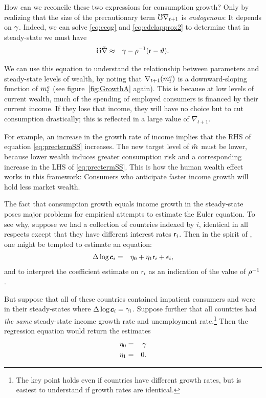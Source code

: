 \documentclass{handout}
\begin{document}
How can we reconcile these two expressions for consumption growth?
Only by realizing that the size of the precautionary term $\mho
\nabla_{t+1}$ is {\it endogenous}: It depends on $\gamma$.  Indeed, we
can solve \eqref{eq:ceqg} and \eqref{eq:cdelapprox2} to determine that
in steady-state we must have 
\begin{eqnarray}
        \mho \check{\nabla} & \approx & \gamma - \rho^{-1}(\mathsf{r}-\vartheta). \label{eq:prectermSS}
\end{eqnarray}

We can use this equation to understand the relationship between
parameters and steady-state levels of wealth, by noting that
$\nabla_{t+1}(m^{e}_{t})$ is a downward-sloping function of
$m^{e}_{t}$ (see figure~\ref{fig:GrowthA} again).  This is because at
low levels of current wealth, much of the spending of employed
consumers is financed by their current income.  If they lose that
income, they will have no choice but to cut consumption drastically; this is
reflected in a large value of $\nabla_{t+1}$.

For example, an increase in the growth rate of income implies that the
RHS of equation \eqref{eq:prectermSS} increases.  The new target level of
$\mTarg^{\null}$ must be lower, because lower wealth induces greater consumption risk and a corresponding increase in the LHS of \eqref{eq:prectermSS}.  This is how the human wealth effect works in this framework:
Consumers who anticipate faster income growth will hold less market wealth.

The fact that consumption growth equals income growth in the
steady-state poses major problems for empirical attempts to estimate
the Euler equation.  To see why, suppose we had a collection of
countries indexed by $i$, identical in all respects except that
they have different interest rates $\mathsf{r}_{i}$.
Then in the spirit of \cite{hallSubstitution}, one might be
tempted to estimate an equation:
\begin{eqnarray}
        \Delta \log \pmb{c}_{i} & = & \eta_{0} + \eta_{1} \mathsf{r}_{i}+\epsilon_{i},
\end{eqnarray}
and to interpret the coefficient estimate on $\mathsf{r}_{i}$ as an indication
of the value of $\rho^{-1}$.

But suppose that all of these countries contained impatient consumers
and were in their steady-states where $\Delta \log \pmb{c}_{i} = \gamma_{i}$.
Suppose further
that all countries had {\it the same} steady-state income growth rate and
unemployment rate.\footnote{The key point holds even if countries have different
growth rates, but is easiest to understand if growth rates are identical.}
Then the regression equation would return the estimates
\begin{eqnarray}
        \eta_{0} & = & \gamma  \\
        \eta_{1} & = & 0.
\end{eqnarray}
\end{document}
